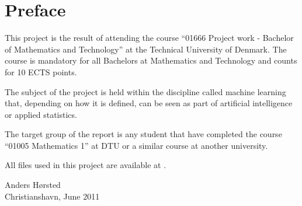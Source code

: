\chapter*{Preface}

This project is the result of attending the course ``01666 Project work - Bachelor of Mathematics and Technology'' at the Technical University of Denmark. The course is mandatory for all Bachelors at Mathematics and Technology and counts for 10 ECTS points. \par

The subject of the project is held within the discipline called machine learning that, depending on how it is defined, can be seen as part of artificial intelligence or applied statistics. \par

The target group of the report is any student that have completed the course ``01005 Mathematics 1'' at DTU or a similar course at another university.

All files used in this project are available at \githuburl{ }.

\vspace{20mm}
Anders Hørsted \\
Christianshavn, June 2011
